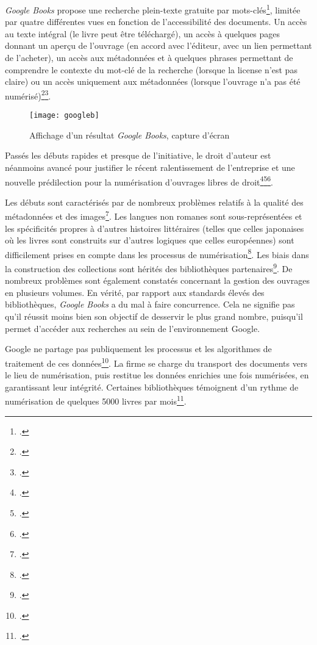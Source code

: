 \textit{Google Books} propose une recherche plein-texte gratuite par mots-clés\footcite{leetaru_mass_2008}, limitée par quatre différentes vues en fonction de l'accessibilité des documents. Un accès au texte intégral (le livre peut être téléchargé), un accès à quelques pages donnant un aperçu de l'ouvrage (en accord avec l'éditeur, avec un lien permettant de l'acheter), un accès aux métadonnées et à quelques phrases permettant de comprendre le contexte du mot-clé de la recherche (lorsque la license n'est pas claire) ou un accès uniquement aux métadonnées (lorsque l'ouvrage n'a pas été numérisé)\footcite{hoffmann_google_2016}\footcite{weiss_using_2014}.
\newpage
\begin{figure}[H]%
\centering
\texttt{[image: googleb]}
\caption{Affichage d'un résultat \textit{Google Books}, capture d'écran}
\end{figure}

Passés les débuts rapides et presque  de l'initiative, le droit d'auteur est néanmoins avancé pour justifier le récent ralentissement de l'entreprise et une nouvelle prédilection pour la numérisation d'ouvrages libres de droit\footcite{thylstrup_politics_2018}\footcite{weiss_examining_2016}\footcite{noauthor_viewpoint_nodate}. 

Les débuts sont caractérisés par de nombreux problèmes relatifs à la qualité des métadonnées et des images\footcite{hoffmann_google_2016}. Les langues non romanes sont sous-représentées et les spécificités propres à d'autres histoires littéraires (telles que celles japonaises où les livres sont construits sur d'autres logiques que celles européennes) sont difficilement prises en compte dans les processus de numérisation\footcite{weiss_examining_2016}. Les biais dans la construction des collections sont hérités des bibliothèques partenaires\footcite{weiss_assessing_2013}. De nombreux problèmes sont également constatés concernant la gestion des ouvrages en plusieurs volumes. En vérité, par rapport aux standards élevés des bibliothèques, \textit{Google Books} a du mal à faire concurrence. Cela ne signifie pas qu'il réussit moins bien son objectif de desservir le plus grand nombre, puisqu'il permet d'accéder aux recherches au sein de l'environnement Google.

Google ne partage pas publiquement les processus et les algorithmes de traitement de ces données\footcite{hoffmann_google_2016}. La firme se charge du transport des documents vers le lieu de numérisation, puis restitue les données enrichies une fois numérisées, en garantissant leur intégrité. Certaines bibliothèques témoignent d'un rythme de numérisation de quelques 5000 livres par mois\footcite{association_pour_le_patrimoine_naturel_et_culturel_du_canton_de_vaud_patrimoine_2012}.

